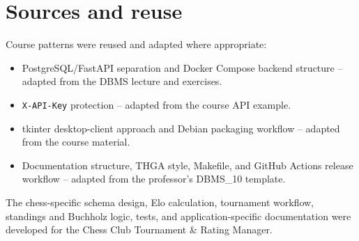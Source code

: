 \documentclass[11pt,a4paper]{article}
\begin{document}
\section*{Sources and reuse}


Course patterns were reused and adapted where appropriate:

\begin{itemize}[leftmargin=1.4em, topsep=2pt]
  \item PostgreSQL/FastAPI separation and Docker Compose backend structure --
        adapted from the DBMS lecture and exercises.
  \item \texttt{X-API-Key} protection -- adapted from the course API example.
  \item tkinter desktop-client approach and Debian packaging workflow --
        adapted from the course material.
  \item Documentation structure, THGA style, Makefile, and GitHub Actions
        release workflow -- adapted from the professor's DBMS\_10 template.
\end{itemize}

The chess-specific schema design, Elo calculation, tournament workflow,
standings and Buchholz logic, tests, and application-specific documentation
were developed for the Chess Club Tournament \& Rating Manager.
\end{document}
